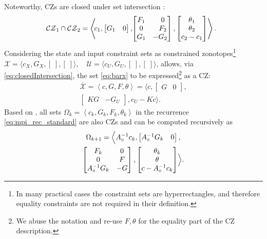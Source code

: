 \documentclass[journal,twoside,web]{ieeecolor}
\newcommand{\bbm}{\begin{bmatrix}}
\newcommand{\ebm}{\end{bmatrix}}
\newcommand{\bbm}{\begin{bmatrix}}
\newcommand{\ebm}{\end{bmatrix}}
\begin{document}
Noteworthy, CZs are closed under set intersection \cite{scott2016constrained}:
\begin{equation}
\label{eq:closedIntersection}
    \mkern-10mu \mathcal{CZ}_1 \cap \mathcal{CZ}_2 = \left\langle \mkern-4mu c_1, \bbm G_1 & 0 \ebm,\mkern-4mu  \bbm F_1 & \hphantom{-}0 \\ 0 & \hphantom{-}F_2 \\ G_1 & -G_2 \ebm, \bbm \theta_1 \\ \theta_2 \\ c_2 - c_1\ebm \right\rangle.
\end{equation}
Considering the state and input constraint sets as constrained zonotopes\footnote{In many practical cases the constraint sets are hyperrectangles, and therefore equality constraints are not required in their definition.}
$\mathcal X=\langle c_X, G_X, [\;], [\;]\rangle, \quad \mathcal U=\langle c_U, G_U, [\;], [\;]\rangle$, allows, via \eqref{eq:closedIntersection}, the set \eqref{eq:barx} to be expressed\footnote{We abuse the notation and re-use $F,\theta$ for the equality part of the CZ description.} as a CZ:
\begin{multline}
\label{eq:x_constr_zon}
\overline{\mathcal X} = \left\langle c, G, F, \theta\right\rangle =\bigl\langle c, \bbm G& 0\ebm,\\ \bbm KG& -G_U\ebm, c_U-Kc\bigr\rangle.
\end{multline}
Based on \cite{10552328}, all sets $\Omega_k = \left\langle c_k, G_k, F_k, \theta_k\right\rangle$ in the recurrence \eqref{eq:mpi_rec_standard} are also CZs and can be computed recursively as
\begin{multline}
\label{eq:mpi_constr_zon}
\Omega_{k+1} =\Bigl\langle A_\circ^{-1}c_k, \bbm A_\circ^{-1}G_k& 0\ebm,\\
    \bbm F_k&0\\ 0& F\\ A_\circ^{-1}G_k& -G\ebm,  \bbm\theta_k\\\theta\\c-A_\circ^{-1}c_k\ebm\Bigr\rangle.
\end{multline}

\vspace{-1.5em}
\end{document}
